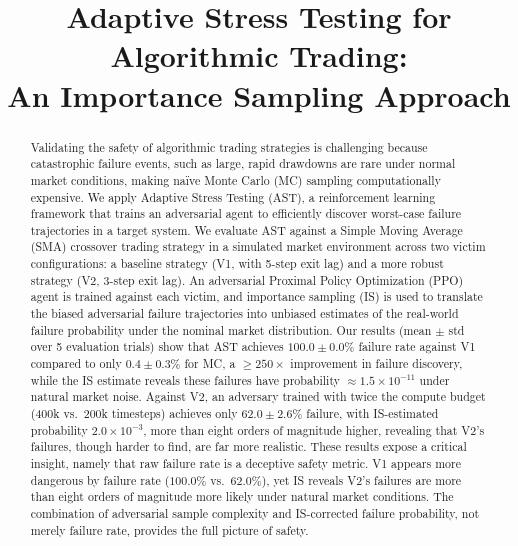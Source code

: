 \documentclass[conference]{IEEEtran}
\begin{document}
\title{Adaptive Stress Testing for Algorithmic Trading: \\An Importance Sampling Approach}

\author{
}

\maketitle

\begin{abstract}
Validating the safety of algorithmic trading strategies is challenging because
catastrophic failure events, such as large, rapid drawdowns are rare under normal market conditions, making naïve Monte Carlo (MC) sampling computationally expensive. We apply Adaptive Stress Testing (AST), a reinforcement learning
framework that trains an adversarial agent to efficiently discover worst-case
failure trajectories in a target system. We evaluate AST against a Simple Moving Average (SMA) crossover trading strategy in a simulated market environment across two victim configurations: a baseline strategy (V1, with 5-step exit lag) and a more robust strategy (V2, 3-step exit lag).
An adversarial Proximal Policy Optimization (PPO) agent is trained against each victim, and importance sampling (IS) is used to translate the biased adversarial failure trajectories
into unbiased estimates of the real-world failure probability under the
nominal market distribution.
Our results (mean $\pm$ std over 5 evaluation trials) show that AST achieves
$100.0 \pm 0.0\%$ failure rate against V1 compared to only $0.4 \pm 0.3\%$
for MC, a $\geq\!250\times$ improvement in failure discovery, while the IS
estimate reveals these failures have probability
$\approx 1.5 \times 10^{-11}$ under natural market noise.
Against V2, an adversary trained with twice the compute budget (400k vs.\ 200k timesteps)
achieves only $62.0 \pm 2.6\%$ failure, with IS-estimated probability
$2.0 \times 10^{-3}$, more than eight orders of magnitude higher, revealing
that V2's failures, though harder to find, are far more realistic.
These results expose a critical insight, namely that raw failure rate is a deceptive
safety metric. V1 appears more dangerous by failure rate ($100.0\%$ vs.\
$62.0\%$), yet IS reveals V2's failures are more than eight orders of
magnitude more likely under natural market conditions. The combination of
adversarial sample complexity and IS-corrected failure probability, not merely failure rate,
provides the full picture of safety.
\end{abstract}
\end{document}
